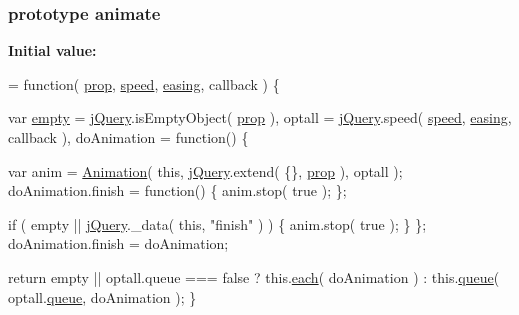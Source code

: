 \subsubsection[{animate}]{ {\bf prototype} animate}\label{jquery-1_810_82-vsdoc_8js_a956a1d08128d41115c45b6815814a64d}
{\bfseries Initial value\+:}
\begin{DoxyCode}
= \textcolor{keyword}{function}( \hyperlink{jquery-1_810_82-vsdoc_8js_af17be84954030af6c2286f5da385d41b}{prop}, \hyperlink{jquery-1_810_82-vsdoc_8js_add98c90065e6563cba26ff6d2016c46c}{speed}, \hyperlink{jquery-1_810_82-vsdoc_8js_a9758a312629fa6de1744280dd6e6253b}{easing}, callback ) \{


        var \hyperlink{jquery-1_810_82-vsdoc_8js_ad242f812bdc5013e0cbf15d6e4d6800a}{empty} = \hyperlink{jquery-1_810_82-vsdoc_8js_add5237586d970a38a81f990e8eb28c6c}{jQuery}.isEmptyObject( \hyperlink{jquery-1_810_82-vsdoc_8js_af17be84954030af6c2286f5da385d41b}{prop} ),
            optall = \hyperlink{jquery-1_810_82-vsdoc_8js_add5237586d970a38a81f990e8eb28c6c}{jQuery}.speed( \hyperlink{jquery-1_810_82-vsdoc_8js_add98c90065e6563cba26ff6d2016c46c}{speed}, \hyperlink{jquery-1_810_82-vsdoc_8js_a9758a312629fa6de1744280dd6e6253b}{easing}, callback ),
            doAnimation = \textcolor{keyword}{function}() \{
                
                var anim = \hyperlink{jquery-1_810_82-vsdoc_8js_a3299b781c8ec8287357326920ab3565a}{Animation}( \textcolor{keyword}{this}, \hyperlink{jquery-1_810_82-vsdoc_8js_add5237586d970a38a81f990e8eb28c6c}{jQuery}.extend( \{\}, 
      \hyperlink{jquery-1_810_82-vsdoc_8js_af17be84954030af6c2286f5da385d41b}{prop} ), optall );
                doAnimation.finish = \textcolor{keyword}{function}() \{
                    anim.stop( \textcolor{keyword}{true} );
                \};
                
                \textcolor{keywordflow}{if} ( empty || \hyperlink{jquery-1_810_82-vsdoc_8js_add5237586d970a38a81f990e8eb28c6c}{jQuery}.\_data( \textcolor{keyword}{this}, \textcolor{stringliteral}{"finish"} ) ) \{
                    anim.stop( \textcolor{keyword}{true} );
                \}
            \};
            doAnimation.finish = doAnimation;

        \textcolor{keywordflow}{return} empty || optall.queue === \textcolor{keyword}{false} ?
            this.\hyperlink{jquery-1_810_82-vsdoc_8js_aae0bcb6b00035445a8f9b262c96ea8a2}{each}( doAnimation ) :
            this.\hyperlink{jquery-1_810_82-vsdoc_8js_a4a4ce67ab280eb2cff0622a3bdc1f5b3}{queue}( optall.\hyperlink{jquery-1_810_82-vsdoc_8js_a4a4ce67ab280eb2cff0622a3bdc1f5b3}{queue}, doAnimation );
    \}
\end{DoxyCode}
\hypertarget{jquery-1_810_82-vsdoc_8js_a3299b781c8ec8287357326920ab3565a}{}

